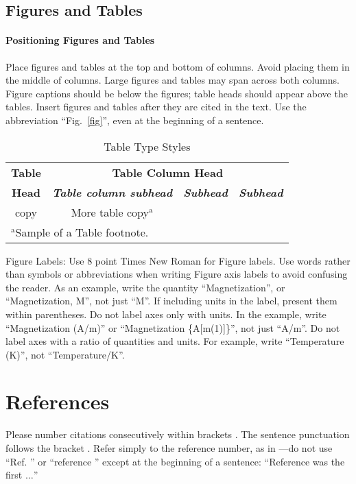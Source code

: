 \documentclass[conference]{IEEEtran}
\begin{document}
\subsection{Figures and Tables}
\paragraph{Positioning Figures and Tables} Place figures and tables at the top and 
bottom of columns. Avoid placing them in the middle of columns. Large 
figures and tables may span across both columns. Figure captions should be 
below the figures; table heads should appear above the tables. Insert 
figures and tables after they are cited in the text. Use the abbreviation 
``Fig.~\ref{fig}'', even at the beginning of a sentence.

\begin{table}[htbp]
\caption{Table Type Styles}
\begin{center}
\begin{tabular}{|c|c|c|c|}
\hline
\textbf{Table}&\multicolumn{3}{|c|}{\textbf{Table Column Head}} \\
\cline{2-4} 
\textbf{Head} & \textbf{\textit{Table column subhead}}& \textbf{\textit{Subhead}}& \textbf{\textit{Subhead}} \\
\hline
copy& More table copy$^{\mathrm{a}}$& &  \\
\hline
\multicolumn{4}{l}{$^{\mathrm{a}}$Sample of a Table footnote.}
\end{tabular}
\label{tab1}
\end{center}
\end{table}

Figure Labels: Use 8 point Times New Roman for Figure labels. Use words 
rather than symbols or abbreviations when writing Figure axis labels to 
avoid confusing the reader. As an example, write the quantity 
``Magnetization'', or ``Magnetization, M'', not just ``M''. If including 
units in the label, present them within parentheses. Do not label axes only 
with units. In the example, write ``Magnetization (A/m)'' or ``Magnetization 
\{A[m(1)]\}'', not just ``A/m''. Do not label axes with a ratio of 
quantities and units. For example, write ``Temperature (K)'', not 
``Temperature/K''.


\section*{References}

Please number citations consecutively within brackets \cite{b1}. The 
sentence punctuation follows the bracket \cite{b2}. Refer simply to the reference 
number, as in \cite{b3}---do not use ``Ref. \cite{b3}'' or ``reference \cite{b3}'' except at 
the beginning of a sentence: ``Reference \cite{b3} was the first $\ldots$''
\end{document}
